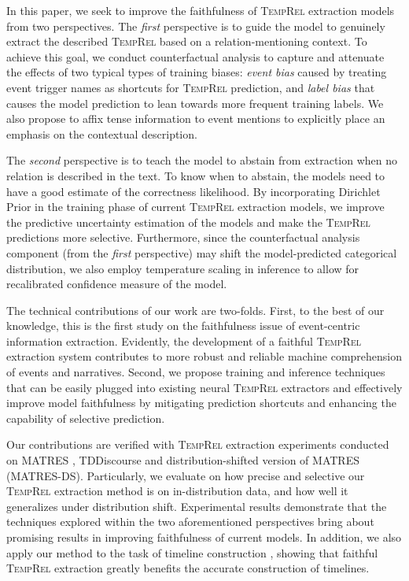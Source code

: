\documentclass[11pt]{article}
\newcommand{\temprel}{\textsc{TempRel}\xspace}
\begin{document}
In this paper, we seek to improve the faithfulness of \temprel extraction models from two perspectives.
The \textit{first} perspective is to guide the model to genuinely extract the described \temprel based on a relation-mentioning context. To achieve this goal, we conduct counterfactual analysis \cite{niu2021counterfactual} 
to capture and attenuate the effects of two typical types of training biases: \textit{event bias} caused by treating event trigger names as shortcuts for \temprel prediction,
and \textit{label bias} that causes the model prediction to lean towards more frequent training labels.
We also propose to affix tense information to event mentions to explicitly place an emphasis on the contextual description.




The \textit{second} perspective is to teach the model to abstain from extraction when no relation
is described in the text. 
To know when to abstain, the models need to have a good estimate of the correctness likelihood. 
By incorporating Dirichlet Prior \cite{malinin2018, malinin2019reverse} in the training phase of current \temprel extraction models, we improve the predictive uncertainty estimation of the models and make the \temprel predictions more selective.
Furthermore, since the counterfactual analysis component (from the \textit{first} perspective) may shift the model-predicted categorical  distribution,
we also employ temperature scaling \cite{pmlr-v70-guo17a} in inference to allow for recalibrated confidence measure of the model.


The technical contributions of our work are two-folds.
First, to the best of our knowledge, this is the first
study on the faithfulness issue of event-centric information extraction.
Evidently, the development of a faithful \temprel extraction system contributes to more robust and reliable machine comprehension of events and narratives.
Second, we propose training and inference techniques that can be easily plugged into existing neural \temprel extractors and effectively improve model faithfulness by mitigating prediction shortcuts and enhancing the capability of selective prediction.


Our contributions are verified with \temprel extraction experiments conducted on MATRES \cite{ning-etal-2018-multi}, TDDiscourse \cite{naik-etal-2019-tddiscourse} and distribution-shifted version of MATRES (MATRES-DS).
Particularly, we evaluate on how precise and selective our \temprel extraction method is on in-distribution data, and how well it generalizes under distribution shift.
Experimental results demonstrate that the techniques explored within the two aforementioned perspectives bring about promising results in improving faithfulness of current models.
In addition, we also apply our method to the task of timeline construction \cite{do-etal-2012-joint},
showing that faithful \temprel extraction greatly benefits the accurate construction of timelines. 
\end{document}
